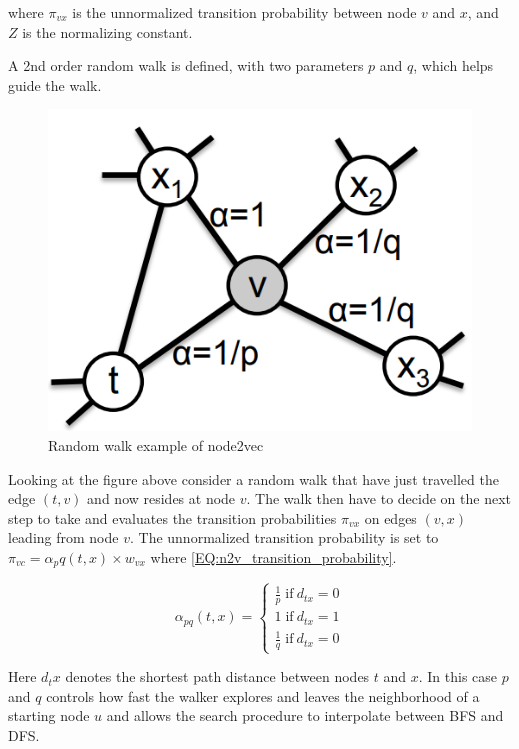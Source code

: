 where $\pi_{vx}$ is the unnormalized transition probability between node $v$ and $x$, and $Z$ is the normalizing constant.

A 2nd order random walk is defined, with two parameters $p$ and $q$, which helps guide the walk.

\begin{figure}[H]
\centering
  \includegraphics[scale=0.5]{Article/figures/randomwalkexample.png}
  \caption{Random walk example of node2vec}
  \label{fig:n2v_randomwalk}
\end{figure}

Looking at the figure above consider a random walk that have just travelled the edge $(t, v)$ and now resides at node $v$. The walk then have to decide on the next step to take and evaluates the transition probabilities $\pi_{vx}$ on edges $(v,x)$ leading from node $v$. The unnormalized transition probability is set to $\pi_{vc} = \alpha_pq (t,x) \times w_{vx}$ where \autoref{EQ:n2v_transition_probability}.

\begin{equation}\label{EQ:n2v_transition_probability}
\alpha_{pq} (t,x) =
\begin{cases} 
	\frac{1}{p} \; \text{if} \:  d_{tx} = 0 \\
	1 \; \text{if} \: d_{tx} = 1 \\
	\frac{1}{q} \; \text{if} \: d_{tx} = 0
\end{cases}
\end{equation}


Here $d_tx$ denotes the shortest path distance between nodes $t$ and $x$. In this case $p$ and $q$ controls how fast the walker explores and leaves the neighborhood of a starting node $u$ and allows the search procedure to interpolate between BFS and DFS.

